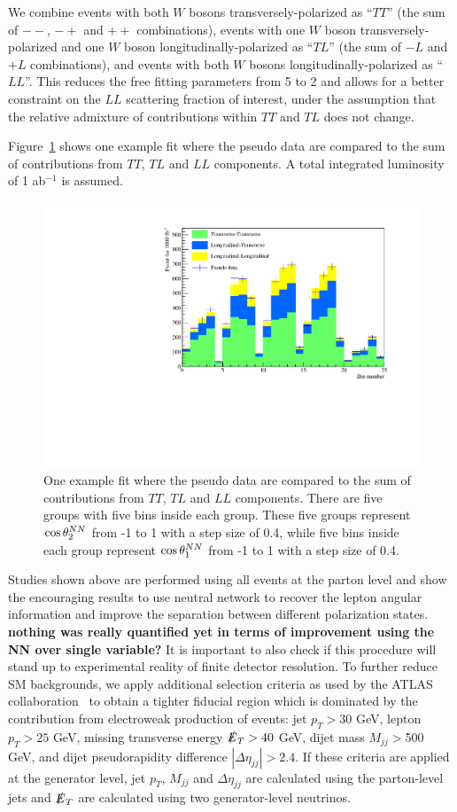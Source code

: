 We combine events with both $W$ bosons transversely-polarized as
``$TT$'' (the sum of $--$, $-+$ and $++$ combinations), events with
one $W$ boson transversely-polarized and one $W$ boson
longitudinally-polarized as ``$TL$'' (the sum of $-L$ and $+L$
combinations), and events with both $W$ bosons
longitudinally-polarized as ``$LL$''. This reduces the free fitting parameters from 5 to 2 and 
allows for a better constraint on the $LL$ scattering fraction of interest, under the assumption that
the relative admixture of contributions within $TT$ and $TL$ does not change. 

Figure~\ref{fig:fit_example} shows one example fit where the pseudo data are compared to the sum of 
contributions from $TT$, $TL$ and $LL$ components. A total integrated luminosity of 1 ab$^{-1}$ is assumed.  

\begin{figure}[h]
\includegraphics[width=.49\textwidth]{./fig/NN_fit_3.pdf}
\caption{\label{fig:fit_example} One example fit where the pseudo data are compared to the sum of 
contributions from $TT$, $TL$ and $LL$ components. There are five groups with five bins inside each group. 
These five groups represent $ \cos \theta^{NN}  _2$ from -1 to 1 with a step size of 0.4, while five bins inside each group represent $ \cos \theta^{NN}  _1$ from -1 to 1 with a step size of 0.4.}
\end{figure}

Studies shown above are performed using all events at the parton level  
and show the encouraging results to use neutral network to recover the lepton angular information and improve the separation between different polarization states. {\bf nothing was really quantified yet in terms of improvement using the NN over single variable?}
It is important to also check if this procedure will stand up to experimental reality of finite detector resolution. 
To further reduce SM backgrounds, we apply additional selection criteria as used by the ATLAS collaboration~\cite{ATLAS_ssWW} to obtain a
tighter fiducial region which is dominated by the contribution from electroweak production of \ssWW events: jet $p_T > 30$ GeV, lepton $p_T > 25$ GeV, missing transverse energy $\slashed{E}_T > 40$ GeV, 
dijet mass $M_{jj} > $500 GeV, and dijet pseudorapidity difference $|\Delta \eta_{jj}| > 2.4 $. 
If these criteria are applied at the generator level, jet $p_T$, $M_{jj}$ and $\Delta \eta_{jj}$ are calculated using the parton-level jets 
and $\slashed{E}_T$ are calculated using two generator-level neutrinos.

